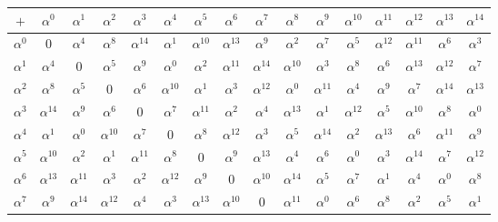 \documentclass[12pt,a4paper]{article}
\begin{document}
\vspace{3cm}

\begin{minipage}{1\textwidth}
\begin{tabular}{c|ccccccccccccccc}
$+$ & $\alpha^0$ & $\alpha^1$ & $\alpha^2$ & $\alpha^3$ & $\alpha^4$ & $\alpha^5$ & $\alpha^6$ & $\alpha^7$ & $\alpha^8$ & $\alpha^9$ & $\alpha^{10}$ & $\alpha^{11}$ & $\alpha^{12}$ & $\alpha^{13}$ & $\alpha^{14}$\\ \hline
$\alpha^0$    & 0 & $\alpha^{4}$ & $\alpha^{8}$ & $\alpha^{14}$ & $\alpha^{1}$ & $\alpha^{10}$ & $\alpha^{13}$ & $\alpha^{9}$ & $\alpha^{2}$ & $\alpha^{7}$ & $\alpha^{5}$ & $\alpha^{12}$ & $\alpha^{11}$ & $\alpha^{6}$ & $\alpha^{3}$ \\
$\alpha^1$    & $\alpha^{4}$ & 0 & $\alpha^{5}$ & $\alpha^{9}$ & $\alpha^{0}$ & $\alpha^{2}$ & $\alpha^{11}$ & $\alpha^{14}$ & $\alpha^{10}$ & $\alpha^{3}$ & $\alpha^{8}$ & $\alpha^{6}$ & $\alpha^{13}$ & $\alpha^{12}$ & $\alpha^{7}$ \\
$\alpha^2$    & $\alpha^{8}$ & $\alpha^{5}$ & 0 & $\alpha^{6}$ & $\alpha^{10}$ & $\alpha^{1}$ & $\alpha^{3}$ & $\alpha^{12}$ & $\alpha^{0}$ & $\alpha^{11}$ & $\alpha^{4}$ & $\alpha^{9}$ & $\alpha^{7}$ & $\alpha^{14}$ & $\alpha^{13}$ \\
$\alpha^3$    & $\alpha^{14}$ & $\alpha^{9}$ & $\alpha^{6}$ & 0 & $\alpha^{7}$ & $\alpha^{11}$ & $\alpha^{2}$ & $\alpha^{4}$ & $\alpha^{13}$ & $\alpha^{1}$ & $\alpha^{12}$ & $\alpha^{5}$ & $\alpha^{10}$ & $\alpha^{8}$ & $\alpha^{0}$ \\
$\alpha^4$    & $\alpha^{1}$ & $\alpha^{0}$ & $\alpha^{10}$ & $\alpha^{7}$ & 0 & $\alpha^{8}$ & $\alpha^{12}$ & $\alpha^{3}$ & $\alpha^{5}$ & $\alpha^{14}$ & $\alpha^{2}$ & $\alpha^{13}$ & $\alpha^{6}$ & $\alpha^{11}$ & $\alpha^{9}$ \\
$\alpha^5$    & $\alpha^{10}$ & $\alpha^{2}$ & $\alpha^{1}$ & $\alpha^{11}$ & $\alpha^{8}$ & 0 & $\alpha^{9}$ & $\alpha^{13}$ & $\alpha^{4}$ & $\alpha^{6}$ & $\alpha^{0}$ & $\alpha^{3}$ & $\alpha^{14}$ & $\alpha^{7}$ & $\alpha^{12}$ \\
$\alpha^6$    & $\alpha^{13}$ & $\alpha^{11}$ & $\alpha^{3}$ & $\alpha^{2}$ & $\alpha^{12}$ & $\alpha^{9}$ & 0 & $\alpha^{10}$ & $\alpha^{14}$ & $\alpha^{5}$ & $\alpha^{7}$ & $\alpha^{1}$ & $\alpha^{4}$ & $\alpha^{0}$ & $\alpha^{8}$ \\
$\alpha^7$    & $\alpha^{9}$ & $\alpha^{14}$ & $\alpha^{12}$ & $\alpha^{4}$ & $\alpha^{3}$ & $\alpha^{13}$ & $\alpha^{10}$ & 0 & $\alpha^{11}$ & $\alpha^{0}$ & $\alpha^{6}$ & $\alpha^{8}$ & $\alpha^{2}$ & $\alpha^{5}$ & $\alpha^{1}$ \\

\end{tabular}
\end{minipage}
\end{document}
